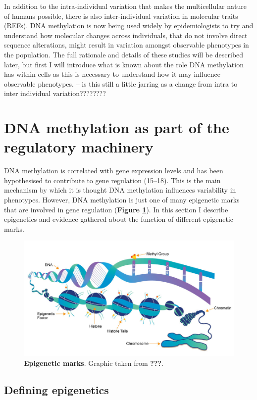 \documentclass[11pt,oneside]{bristolthesis}
\begin{document}
In addition to the intra-individual variation that makes the multicellular nature of humans possible, there is also inter-individual variation in molecular traits (REFs). DNA methylation is now being used widely by epidemiologists to try and understand how molecular changes across individuals, that do not involve direct sequence alterations, might result in variation amongst observable phenotypes in the population. The full rationale and details of these studies will be described later, but first I will introduce what is known about the role DNA methylation has within cells as this is necessary to understand how it may influence observable phenotypes. -- is this still a little jarring as a change from intra to inter individual variation????????

\hypertarget{dnam-as-part-of-regulation}{%
\section{DNA methylation as part of the regulatory machinery}\label{dnam-as-part-of-regulation}}

DNA methylation is correlated with gene expression levels and has been hypothesised to contribute to gene regulation (15--18). This is the main mechanism by which it is thought DNA methylation influences variability in phenotypes. However, DNA methylation is just one of many epigenetic marks that are involved in gene regulation (\textbf{Figure \ref{fig:epigenetic-marks}}). In this section I describe epigenetics and evidence gathered about the function of different epigenetic marks.




\begin{figure}

{\centering \includegraphics[width=1\linewidth]{figure/01-introduction/epigenetic-marks} 

}

\caption[Epigenetic marks]{\textbf{Epigenetic marks}. Graphic taken from \textbf{???}.}\label{fig:epigenetic-marks}
\end{figure}
\hypertarget{defining-epigenetics}{%
\subsection{Defining epigenetics}\label{defining-epigenetics}}
\end{document}
